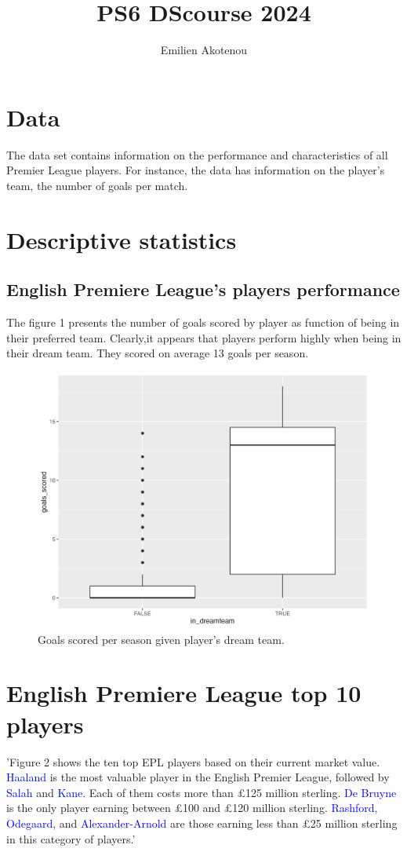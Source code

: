 \documentclass{article}
\title{PS6 DScourse 2024}
\author{Emilien Akotenou}
\begin{document}
\maketitle
\section{Data}
The data set contains information on the performance and characteristics of all Premier League players. For instance, the data has information on the player's team, the number of goals per match.

\section{Descriptive statistics}
\subsection{English Premiere League's players performance}
The figure 1 presents the number of goals scored by player as function of being in their preferred team. Clearly,it appears that players perform highly when being in their dream team. They scored on average 13 goals per season.

\begin{figure}[H]
\centering
\includegraphics[width=0.75\linewidth]{PS6a_Akotenou.png}
\caption{\label{fig:frog}Goals scored per season given player's dream team.}
\end{figure}



\section{English Premiere League top 10 players} 
'Figure 2 shows the ten top EPL players based on their current market value. \textcolor{blue}{Haaland} is the most valuable player in the English Premier League, followed by \textcolor{blue}{Salah} and \textcolor{blue}{Kane}. Each of them costs more than £125 million sterling. \textcolor{blue}{De Bruyne} is the only player earning between £100 and £120 million sterling. \textcolor{blue}{Rashford, Odegaard}, and \textcolor{blue}{Alexander-Arnold} are those earning less than £25 million sterling in this category of players.'
\end{document}

